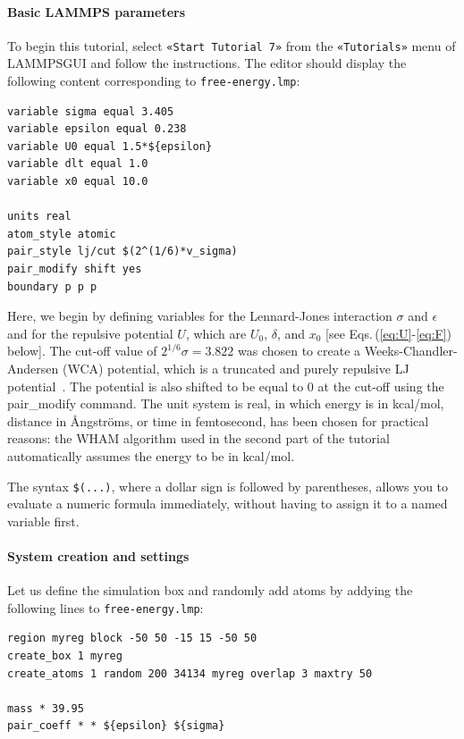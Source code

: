 \documentclass[9pt,tutorial]{livecoms}
\newcommand{\lmpcmd}[1]{\colorbox{listing}{\textcolor{command}{\small{#1}}}} %
\newcommand{\flecmd}[1]{\textcolor{command}{\texttt{#1}}} %
\newcommand{\guicmd}[1]{\textcolor{command}{\texttt{«#1»}}} %
\newcommand{\lammpsgui}{\textsf{LAMMPS\textendash GUI}}
\begin{document}
\paragraph{Basic LAMMPS parameters}

To begin this tutorial, select \guicmd{Start Tutorial 7} from the
\guicmd{Tutorials} menu of \lammpsgui{} and follow the instructions.
The editor should display the following content corresponding to \flecmd{free-energy.lmp}:
\begin{lstlisting}
variable sigma equal 3.405
variable epsilon equal 0.238
variable U0 equal 1.5*${epsilon}
variable dlt equal 1.0
variable x0 equal 10.0

units real
atom_style atomic
pair_style lj/cut $(2^(1/6)*v_sigma)
pair_modify shift yes
boundary p p p
\end{lstlisting}
Here, we begin by defining variables for the Lennard-Jones interaction
$\sigma$ and $\epsilon$ and for the repulsive potential
$U$, which are $U_0$, $\delta$, and
$x_0$ [see Eqs.\,(\ref{eq:U}-\ref{eq:F}) below].  {\color{blue}The cut-off value of
$ 2^{1/6} \sigma = 3.822$ was chosen to create a Weeks-Chandler-Andersen (WCA) potential,
which is a truncated and purely repulsive LJ potential~\cite{weeks1971role}.}
The potential is also shifted to be equal to 0 at the cut-off
using the \lmpcmd{pair\_modify} command.  The unit system is
\lmpcmd{real}, in which energy is in kcal/mol, distance in Ångströms, or
time in femtosecond, has been chosen for practical reasons: the WHAM
algorithm used in the second part of the tutorial automatically assumes
the energy to be in kcal/mol.

\begin{note}
  {\color{blue}The syntax \texttt{\$(...)}, where a dollar sign is followed by parentheses, allows
  you to evaluate a numeric formula immediately, without having to assign it
  to a named variable first.}
\end{note}

\paragraph{System creation and settings}

Let us define the simulation box and randomly add atoms by addying the
following lines to \flecmd{free-energy.lmp}:
\begin{lstlisting}
region myreg block -50 50 -15 15 -50 50
create_box 1 myreg
create_atoms 1 random 200 34134 myreg overlap 3 maxtry 50

mass * 39.95
pair_coeff * * ${epsilon} ${sigma}
\end{lstlisting}
\end{document}
